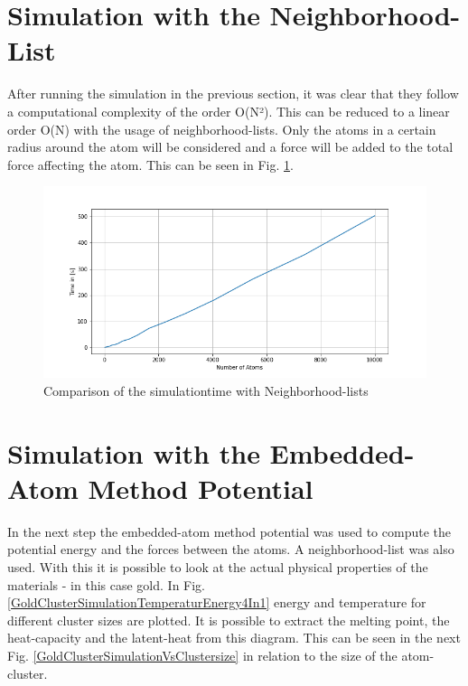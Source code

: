 \section{Simulation with the Neighborhood-List}

After running the simulation in the previous section, it was clear that they follow a computational complexity of the order O(N²). This can be reduced to a linear order O(N) with the usage of neighborhood-lists. Only the atoms in a certain radius around the atom will be considered and a force will be added to the total force affecting the atom. This can be seen in Fig. \ref{PlotSimulationTimesCutoffNew}.
\begin{figure}
	\begin{center}
		\includegraphics[scale=1.25]{Figure/plotAtomTimesMoreData.png}
	\end{center}
	\caption[Comparison of the simulationtime with neighborhood-lists ]{Comparison of the simulationtime with Neighborhood-lists}
	\label{PlotSimulationTimesCutoffNew}
\end{figure}

\section{Simulation with the Embedded-Atom Method Potential}

In the next step the embedded-atom method potential was used to compute the potential energy and the forces between the atoms. A neighborhood-list was also used. With this it is possible to look at the actual physical properties of the materials - in this case gold. In Fig.  \ref{GoldClusterSimulationTemperaturEnergy4In1} energy and temperature for different cluster sizes are plotted. It is possible to extract the melting point, the heat-capacity and the latent-heat from this diagram. This can be seen in the next Fig. \ref{GoldClusterSimulationVsClustersize} in relation to the size of the atom-cluster.

